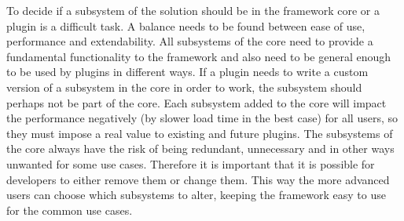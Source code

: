 \documentclass[a4paper,11pt]{kth-mag}
\begin{document}

        To decide if a subsystem of the solution should be in the framework core or a plugin is a difficult task.
        A balance needs to be found between ease of use, performance and extendability.
        All subsystems of the core need to provide a fundamental functionality to the framework and also need to be general enough to be used by plugins in different ways.
        If a plugin needs to write a custom version of a subsystem in the core in order to work, the subsystem should perhaps not be part of the core.
        Each subsystem added to the core will impact the performance negatively (by slower load time in the best case) for all users, so they must impose a real value to existing and future plugins.
        The subsystems of the core always have the risk of being redundant, unnecessary and in other ways unwanted for some use cases.
        Therefore it is important that it is possible for developers to either remove them or change them.
        This way the more advanced users can choose which subsystems to alter, keeping the framework easy to use for the common use cases.

        
\end{document}
